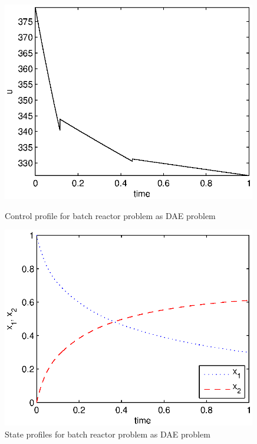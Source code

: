 \begin{figure}[htb]
\begin{minipage}[t]{0.5\linewidth}
\centering
\includegraphics[width=0.99\textwidth]{examples/problem5_dae/graphs/u_523daea.eps}
\caption[Tutorial example 6: control profile]{Control profile for
  batch reactor problem as DAE problem}\label{fig:prob5dae_u} 
\end{minipage}
\begin{minipage}[t]{0.5\linewidth}
\centering
\includegraphics[width=0.99\textwidth]{examples/problem5_dae/graphs/x12_523daea.eps}
\caption[Tutorial example 6: state profiles]{State profiles for batch
  reactor problem as DAE problem}\label{fig:prob5dae_x} 
\end{minipage}
\end{figure}


